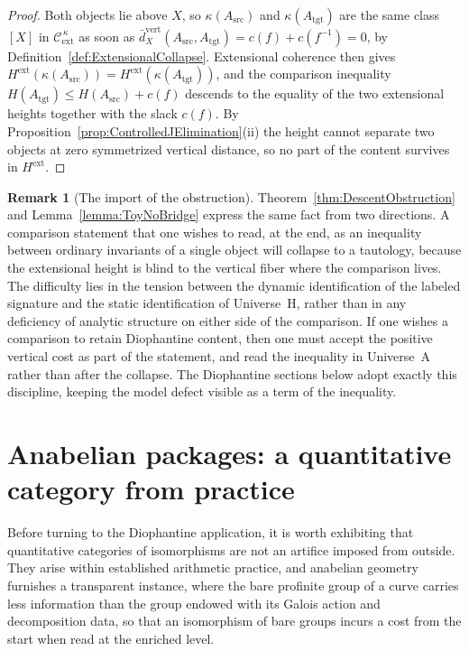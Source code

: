 \documentclass[10pt, reqno]{amsart}
\theoremstyle{plain}
\theoremstyle{definition}
\newtheorem{remark}[theorem]{Remark}
\theoremstyle{plain}
\begin{document}
\begin{proof}
Both objects lie above $X$, so $\kappa(A_{\mathrm{src}})$ and $\kappa(A_{\mathrm{tgt}})$ are the same class $[X]$ in $\mathcal{C}_{\mathrm{ext}}^{\,\kappa}$ as soon as $\bar{d}_X^{\mathrm{vert}}(A_{\mathrm{src}}, A_{\mathrm{tgt}}) = c(f) + c(f^{-1}) = 0$, by Definition~\ref{def:ExtensionalCollapse}. Extensional coherence then gives $H^{\mathrm{ext}}(\kappa(A_{\mathrm{src}})) = H^{\mathrm{ext}}(\kappa(A_{\mathrm{tgt}}))$, and the comparison inequality $H(A_{\mathrm{tgt}}) \le H(A_{\mathrm{src}}) + c(f)$ descends to the equality of the two extensional heights together with the slack $c(f)$. By Proposition~\ref{prop:ControlledJElimination}(ii) the height cannot separate two objects at zero symmetrized vertical distance, so no part of the content survives in $H^{\mathrm{ext}}$.
\end{proof}

\begin{remark}[The import of the obstruction]\label{rem:MoralObstruction}
Theorem~\ref{thm:DescentObstruction} and Lemma~\ref{lemma:ToyNoBridge} express the same fact from two directions. A comparison statement that one wishes to read, at the end, as an inequality between ordinary invariants of a single object will collapse to a tautology, because the extensional height is blind to the vertical fiber where the comparison lives. The difficulty lies in the tension between the dynamic identification of the labeled signature and the static identification of Universe~H, rather than in any deficiency of analytic structure on either side of the comparison. If one wishes a comparison to retain Diophantine content, then one must accept the positive vertical cost as part of the statement, and read the inequality in Universe~A rather than after the collapse. The Diophantine sections below adopt exactly this discipline, keeping the model defect visible as a term of the inequality.
\end{remark}


\section{Anabelian packages: a quantitative category from practice}\label{sec:Anabelian}

Before turning to the Diophantine application, it is worth exhibiting that quantitative categories of isomorphisms are not an artifice imposed from outside. They arise within established arithmetic practice, and anabelian geometry furnishes a transparent instance, where the bare profinite group of a curve carries less information than the group endowed with its Galois action and decomposition data, so that an isomorphism of bare groups incurs a cost from the start when read at the enriched level.
\end{document}

